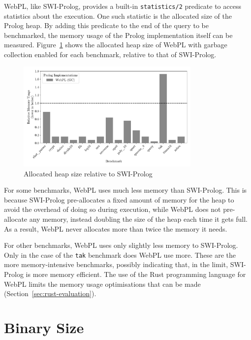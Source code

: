 \label{sec:prolog-heap-usage}

WebPL, like SWI-Prolog, provides a built-in \texttt{statistics/2} predicate to access statistics about the execution. One such statistic is the allocated size of the Prolog heap. By adding this predicate to the end of the query to be benchmarked, the memory usage of the Prolog implementation itself can be measured. Figure~\ref{fig:heap-usage} shows the allocated heap size of WebPL with garbage collection enabled for each benchmark, relative to that of SWI-Prolog.

\begin{figure}[t]
\centering
\includegraphics[width=0.8\textwidth]{relative_memory_builtin.pdf}
\caption{Allocated heap size relative to SWI-Prolog}
\label{fig:heap-usage}
\end{figure}

For some benchmarks, WebPL uses much less memory than SWI-Prolog. This is because SWI-Prolog pre-allocates a fixed amount of memory for the heap to avoid the overhead of doing so during execution, while WebPL does not pre-allocate any memory, instead doubling the size of the heap each time it gets full. As a result, WebPL never allocates more than twice the memory it needs.

For other benchmarks, WebPL uses only slightly less memory to SWI-Prolog. Only in the case of the \texttt{tak} benchmark does WebPL use more. These are the more memory-intensive benchmarks, possibly indicating that, in the limit, SWI-Prolog is more memory efficient. The use of the Rust programming language for WebPL limits the memory usage optimisations that can be made (Section~\ref{sec:rust-evaluation}).

\section{Binary Size}

